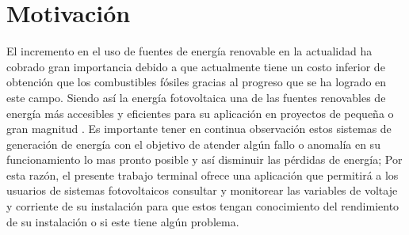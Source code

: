 \section{Motivación}
El incremento en el uso de fuentes de energía renovable en la actualidad ha cobrado gran importancia debido a que actualmente tiene un costo inferior de obtención que los combustibles fósiles gracias al progreso que se ha logrado en este campo. Siendo así la energía fotovoltaica una de las fuentes renovables de energía más accesibles y eficientes para su aplicación en proyectos de pequeña o gran magnitud \citep{Not1}.
Es importante tener en continua observación estos sistemas de generación de energía con el objetivo de atender algún fallo o anomalía en su funcionamiento lo mas pronto posible y así disminuir las pérdidas de energía; Por esta razón, el presente trabajo terminal ofrece una aplicación que permitirá a los usuarios de sistemas fotovoltaicos consultar y monitorear las variables de voltaje y corriente de su instalación para que estos tengan conocimiento del rendimiento de su instalación o si este tiene algún problema. 
